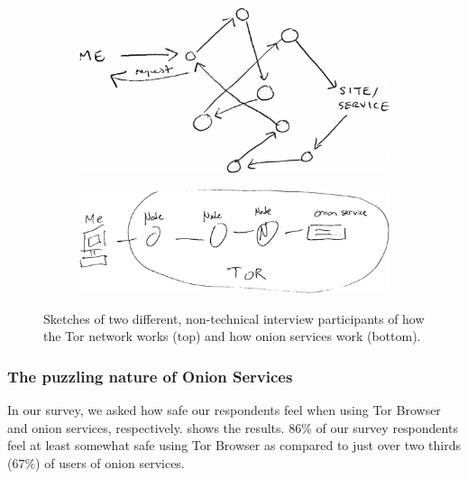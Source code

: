 \begin{figure}[t]
    \centering

    \begin{subfigure}[t]{\linewidth}
        \centering
        \includegraphics[width=0.8\linewidth]{figures/tor-sketch.jpg}
        \label{fig:tor-sketch}
    \end{subfigure}

    \begin{subfigure}[t]{\linewidth}
        \centering
        \includegraphics[width=0.8\linewidth]{figures/os-sketch.jpg}
        \label{fig:os-sketch}
    \end{subfigure}

    \caption{Sketches of two different, non-technical interview participants of
    how the Tor network works (top) and how onion services work (bottom).}
\end{figure}







\subsubsection{The puzzling nature of Onion Services}
In our survey, we asked how safe our
respondents feel when using Tor Browser and onion services, respectively.
 shows the results.  
86\% of our survey respondents feel at least somewhat safe using Tor Browser as compared to just over two thirds (67\%) of users of onion services.

